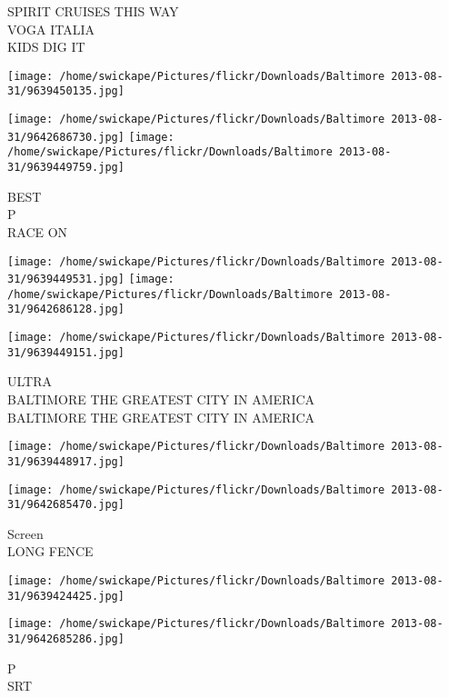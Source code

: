\documentclass[10pt,letterpaper]{article}
\begin{document}
SPIRIT CRUISES THIS WAY\\
VOGA ITALIA\\
KIDS DIG IT\\
\pagebreak

\texttt{[image: /home/swickape/Pictures/flickr/Downloads/Baltimore 2013-08-31/9639450135.jpg]}

\vspace{0.25in}
\texttt{[image: /home/swickape/Pictures/flickr/Downloads/Baltimore 2013-08-31/9642686730.jpg]}
\texttt{[image: /home/swickape/Pictures/flickr/Downloads/Baltimore 2013-08-31/9639449759.jpg]}

BEST\\
P\\
RACE ON\\
\pagebreak

\texttt{[image: /home/swickape/Pictures/flickr/Downloads/Baltimore 2013-08-31/9639449531.jpg]}
\texttt{[image: /home/swickape/Pictures/flickr/Downloads/Baltimore 2013-08-31/9642686128.jpg]}

\vspace{0.25in}
\texttt{[image: /home/swickape/Pictures/flickr/Downloads/Baltimore 2013-08-31/9639449151.jpg]}

ULTRA\\
BALTIMORE THE GREATEST CITY IN AMERICA\\
BALTIMORE THE GREATEST CITY IN AMERICA\\
\pagebreak

\texttt{[image: /home/swickape/Pictures/flickr/Downloads/Baltimore 2013-08-31/9639448917.jpg]}

\vspace{0.25in}
\texttt{[image: /home/swickape/Pictures/flickr/Downloads/Baltimore 2013-08-31/9642685470.jpg]}

Screen\\
LONG FENCE\\
\pagebreak

\texttt{[image: /home/swickape/Pictures/flickr/Downloads/Baltimore 2013-08-31/9639424425.jpg]}

\vspace{0.25in}
\texttt{[image: /home/swickape/Pictures/flickr/Downloads/Baltimore 2013-08-31/9642685286.jpg]}

P\\
SRT\\
\pagebreak
\end{document}
